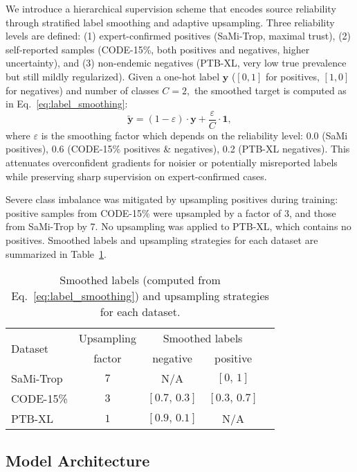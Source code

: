 
We introduce a hierarchical supervision scheme that encodes source reliability through stratified label smoothing and adaptive upsampling. Three reliability levels are defined: (1) expert-confirmed positives (SaMi-Trop, maximal trust), (2) self-reported samples (CODE-15\%, both positives and negatives, higher uncertainty), and (3) non-endemic negatives (PTB-XL, very low true prevalence but still mildly regularized). Given a one-hot label $\mathbf{y}$ ($[0, 1]$ for positives, $[1, 0]$ for negatives) and number of classes $C = 2,$ the smoothed target is computed as in Eq.~\ref{eq:label_smoothing}:
\begin{equation}
\label{eq:label_smoothing}
\tilde{\mathbf{y}} = (1 - \varepsilon) \cdot \mathbf{y} + \frac{\varepsilon}{C} \cdot \mathbf{1},
\end{equation}
where $\varepsilon$ is the smoothing factor which depends on the reliability level: 0.0 (SaMi positives), 0.6 (CODE-15\% positives \& negatives), 0.2 (PTB-XL negatives). This attenuates overconfident gradients for noisier or potentially misreported labels while preserving sharp supervision on expert-confirmed cases.

Severe class imbalance was mitigated by upsampling positives during training: positive samples from CODE-15\% were upsampled by a factor of 3, and those from SaMi-Trop by 7. No upsampling was applied to PTB-XL, which contains no positives. Smoothed labels and upsampling strategies for each dataset are summarized in Table~\ref{tab:augmentation}.

\begin{table}[!htp]
\centering
\begin{tabular}{lcccc}
\toprule
\multirow{2}{*}{Dataset} & Upsampling & \multicolumn{2}{c}{Smoothed labels} \\ \cmidrule(lr){3-4}
& factor & negative & positive \\
\midrule
SaMi-Trop & $7$ & N/A           & $[0,\,1]$     \\
CODE-15\% & $3$ & $[0.7,\,0.3]$ & $[0.3,\,0.7]$ \\
PTB-XL    & $1$ & $[0.9,\,0.1]$ & N/A           \\
\bottomrule
\end{tabular}
\caption{Smoothed labels (computed from Eq.~\ref{eq:label_smoothing}) and upsampling strategies for each dataset.}
\label{tab:augmentation}
\end{table}


\subsection{Model Architecture}
\label{subsec:model}

